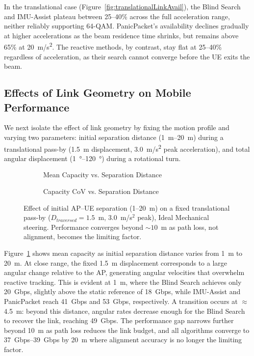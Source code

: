 \documentclass[fleqn,10pt]{wlscirep}
\begin{document}
In the translational case (Figure~\ref{fig:translationalLinkAvail}), the Blind Search and IMU-Assist plateau between 25--40\% across the full acceleration range, neither reliably supporting 64-QAM. PanicPacket's availability declines gradually at higher accelerations as the beam residence time shrinks, but remains above 65\% at \SI{20}{m/s^2}. The reactive methods, by contrast, stay flat at 25--40\% regardless of acceleration, as their search cannot converge before the UE exits the beam.

\subsection*{Effects of Link Geometry on Mobile Performance}

We next isolate the effect of link geometry by fixing the motion profile and varying two parameters: initial separation distance (\SIrange{1}{20}{m}) during a translational pass-by (\SI{1.5}{m} displacement, \SI{3.0}{m/s^2} peak acceleration), and total angular displacement (\SIrange{1}{120}{\degree}) during a rotational turn.

\begin{figure}[h!]
    \centering
    \begin{subfigure}{0.495\linewidth}
        
        \vspace{-25 pt}
        \caption{Mean Capacity vs. Separation Distance}
        \label{fig:dist_rate}
    \end{subfigure}
    \hfill
    \begin{subfigure}{0.495\linewidth}
        
        \vspace{-25 pt}
        \caption{Capacity CoV vs. Separation Distance}
        \label{fig:dist_cov}
    \end{subfigure}
    \caption{Effect of initial AP--UE separation (1--20~m) on a fixed translational pass-by ($D_{traversed} = 1.5$~m, $3.0$~m/s$^2$ peak), Ideal Mechanical steering. Performance converges beyond ${\sim}10$~m as path loss, not alignment, becomes the limiting factor.}
\end{figure} 

Figure~\ref{fig:dist_rate} shows mean capacity as initial separation distance varies from \SI{1}{m} to \SI{20}{m}. At close range, the fixed \SI{1.5}{m} displacement corresponds to a large angular change relative to the AP, generating angular velocities that overwhelm reactive tracking. This is evident at \SI{1}{m}, where the Blind Search achieves only \SI{20}{Gbps}, slightly above the static reference of \SI{18}{Gbps}, while IMU-Assist and PanicPacket reach \SI{41}{Gbps} and \SI{53}{Gbps}, respectively. A transition occurs at $\approx$\SI{4.5}{m}: beyond this distance, angular rates decrease enough for the Blind Search to recover the link, reaching \SI{49}{Gbps}. The performance gap narrows further beyond \SI{10}{m} as path loss reduces the link budget, and all algorithms converge to \SIrange{37}{39}{Gbps} by \SI{20}{m} where alignment accuracy is no longer the limiting factor.
\end{document}
